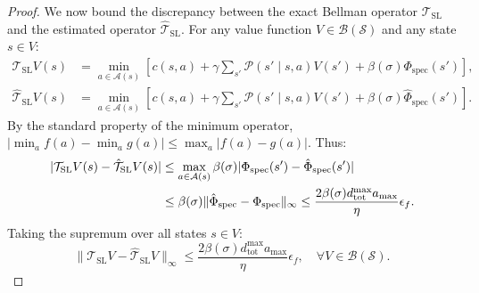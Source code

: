 \documentclass[11pt,a4paper]{article}
\begin{document}
\begin{proof}
We now bound the discrepancy between the exact Bellman operator $\mathcal{T}_{\text{SL}}$ and the estimated operator $\hat{\mathcal{T}}_{\text{SL}}$. For any value function $V \in \mathcal{B}(\mathcal{S})$ and any state $s \in V$:
\begin{align}
\mathcal{T}_{\text{SL}} V(s) &= \min_{a \in \mathcal{A}(s)} \left[ c(s, a) + \gamma \sum_{s'} \mathcal{P}(s' \mid s, a) V(s') + \beta(\sigma) \Phi_{\text{spec}}(s') \right], \\
\hat{\mathcal{T}}_{\text{SL}} V(s) &= \min_{a \in \mathcal{A}(s)} \left[ c(s, a) + \gamma \sum_{s'} \mathcal{P}(s' \mid s, a) V(s') + \beta(\sigma) \hat{\Phi}_{\text{spec}}(s') \right].
\end{align}
By the standard property of the minimum operator, $|\min_a f(a) - \min_a g(a)| \le \max_a |f(a) - g(a)|$. Thus:
\begin{align}
|\mathcal{T}_{\text{SL}} V(s) - \hat{\mathcal{T}}_{\text{SL}} V(s)| &\le \max_{a \in \mathcal{A}(s)} \beta(\sigma) |\Phi_{\text{spec}}(s') - \hat{\Phi}_{\text{spec}}(s')| \notag \\
&\le \beta(\sigma) \|\hat{\Phi}_{\text{spec}} - \Phi_{\text{spec}}\|_\infty \le \frac{2 \beta(\sigma) d_{\text{tot}}^{\max} a_{\max}}{\eta} \epsilon_f.
\end{align}
Taking the supremum over all states $s \in V$:
\begin{equation}
\label{eq:operator_perturbation_bound}
\|\mathcal{T}_{\text{SL}} V - \hat{\mathcal{T}}_{\text{SL}} V\|_\infty \le \frac{2 \beta(\sigma) d_{\text{tot}}^{\max} a_{\max}}{\eta} \epsilon_f, \quad \forall V \in \mathcal{B}(\mathcal{S}).
\end{equation}


\end{proof}
\end{document}
